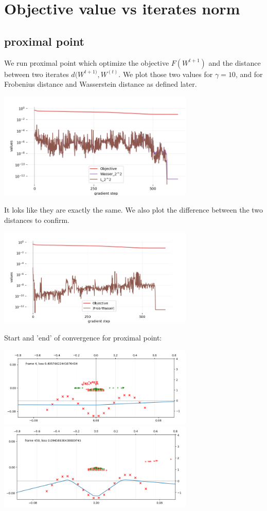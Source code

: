 \section{Objective value vs iterates norm}
\subsection{proximal point}

We run proximal point which optimize the objective $F(W^{t+1})$ and the distance between two iterates $d(W^{t+1)}, W^{(t)}$. We plot those two values for $\gamma=10$, and for Frobenius distance and Wasserstein distance as defined later.

\includegraphics[width=0.7\textwidth]{imgs/tau10_graph_full.png}

It loks like they are exactly the same. We also plot the difference between the two distances to confirm.

\includegraphics[width=0.7\textwidth]{imgs/tau10_graph.png}


Start and 'end' of convergence for proximal point:

\includegraphics[width=0.7\textwidth]{imgs/tau10_plot_start.png}
\includegraphics[width=0.7\textwidth]{imgs/tau10_plot_end.png}


